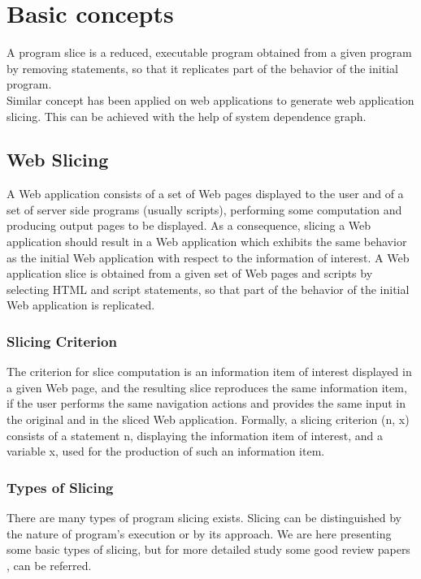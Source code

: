 \documentclass[11pt]{article}   %
\begin{document}
\section{Basic concepts}
A program slice is a reduced, executable program obtained from a given program by removing statements, so that it replicates part of the behavior of the initial program.\cite{Weiser}\cite{weiser1981program}\\
Similar concept has been applied on web applications to generate web application slicing. This can be achieved with the help of system dependence graph.

\subsection{Web Slicing}
A Web application consists of a set of Web pages displayed to the user and of a set of server side programs (usually scripts), performing some computation and producing output pages to be displayed. As a consequence, slicing a Web application should result in a Web application which exhibits the same behavior as the initial Web application with respect to the information of interest.
 A Web application slice is obtained from a given set of Web pages and scripts by selecting HTML and script statements, so that part of the behavior of the initial Web application is replicated.\cite{ricca2001web}\cite{mao2009slicing}


\subsubsection{Slicing Criterion}
The criterion for slice computation is an information item of interest displayed in a given Web page, and the resulting slice reproduces the same information item, if the user performs the same navigation actions and provides the same input in the original and in the sliced Web application. Formally, a slicing criterion (n, x) consists of a statement n, displaying the information item of interest, and a variable x, used for the production of such an information item\cite{ricca2001web}.
\subsubsection{Types of Slicing}
There are many types of program slicing exists. Slicing can be distinguished by the nature of program's execution or by its approach. We are here presenting some basic types of slicing, but for more detailed study some good review papers \cite{Binkley}\cite{de2001program}, can be referred.
\end{document}
